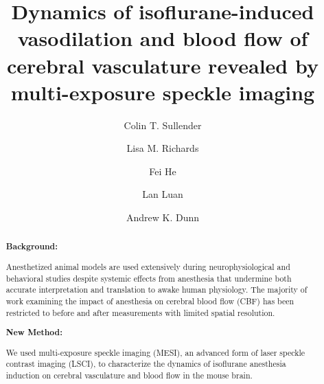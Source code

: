 \documentclass[review]{elsarticle}
\newcommand{\abstractsection}[1]{
  \par\addvspace{.5\baselineskip}
  \noindent\textbf{#1: }\ignorespaces
}
\begin{document}
\begin{frontmatter}


\title{Dynamics of isoflurane-induced vasodilation and blood flow of cerebral vasculature revealed by multi-exposure speckle imaging}

\author[a]{Colin T. Sullender}

\author[a]{Lisa M. Richards}

\author[b]{Fei He}

\author[b,c]{Lan Luan}

\author[a]{Andrew K. Dunn}
 




\begin{abstract}

\abstractsection{Background}
Anesthetized animal models are used extensively during neurophysiological and behavioral studies despite systemic effects from anesthesia that undermine both accurate interpretation and translation to awake human physiology. The majority of work examining the impact of anesthesia on cerebral blood flow (CBF) has been restricted to before and after measurements with limited spatial resolution.

\abstractsection{New Method}
We used multi-exposure speckle imaging (MESI), an advanced form of laser speckle contrast imaging (LSCI), to characterize the dynamics of isoflurane anesthesia induction on cerebral vasculature and blood flow in the mouse brain.


\end{abstract}
\end{frontmatter}
\end{document}
